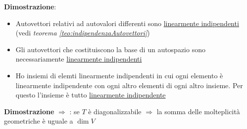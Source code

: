 \documentclass[12pt,a4paper,oneside]{article}
\begin{document}
\label{teo:unioneAutospazi}
\textbf{Dimostrazione}:
\begin{itemize}
	\item Autovettori relativi ad autovalori differenti sono \underline{linearmente indipendenti} (vedi \textit{teorema  \ref{teo:indipendenzaAutovettori}})
	\item Gli autovettori che costituiscono la base di un autospazio sono necessariamente \underline{linearmente indipendenti}
	\item Ho insiemi di elemti linearmente indipendenti in cui ogni elemento è linearmente indipendente con ogni altro elementi di ogni altro insieme. Per questo l'insieme è tutto \underline{linearmente indipendente}
\end{itemize}
\textbf{Dimostrazione} $ \Rightarrow $ : se $ T $ è diagonalizzabile $ \Rightarrow $ la somma delle molteplicità geometriche è uguale a $ \dim V $
\end{document}

